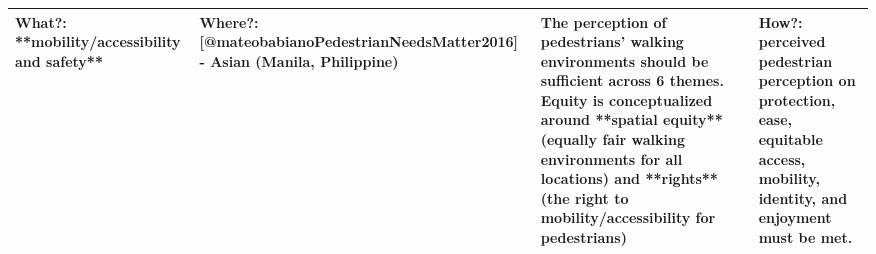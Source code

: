 \documentclass[
  letterpaper,
  DIV=11,
  numbers=noendperiod]{scrartcl}
\begin{document}
\begin{table}
\begin{tabular*}{\linewidth}{@{\extracolsep{\fill}}llll}
What?: **mobility/accessibility and safety** & Where?: [@mateobabianoPedestrianNeedsMatter2016] - Asian (Manila, Philippine) & The perception of pedestrians’ walking environments should be sufficient across 6 themes. Equity is conceptualized around **spatial equity** (equally fair walking environments for all locations) and **rights** (the right to mobility/accessibility for pedestrians) & How?: perceived pedestrian perception on protection, ease, equitable access, mobility, identity, and enjoyment must be met. \\ 
\bottomrule
\end{tabular*}
\end{table}
\end{document}
